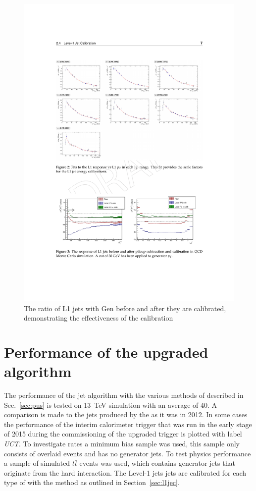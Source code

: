 \begin{figure}
	\begin{center}
		\includegraphics[width=1.0\linewidth]{figs/trigger/pu140_calib_closure}
  \caption{The ratio of L1 jets with Gen before and after they are calibrated,
demonstrating the effectiveness of the calibration}
  \label{fig:pu140calibclosure}
	\end{center}
\end{figure}

\section{Performance of the upgraded algorithm}

\label{sec:jet_algo_performance}

The performance of the jet algorithm with the various methods of \PUS 
described in Sec.~\ref{sec:pus} is tested on 13~TeV \MC simulation with an
average \PU of 40. A comparison is made to the jets produced by the
\GCT as it was in 2012. In some cases the performance of the interim
calorimeter trigger that was run in the early stage of 2015 during the
commissioning of the upgraded trigger is plotted with label
\emph{UCT}. To investigate rates a minimum bias sample was used, this
sample only consists of overlaid \PU events and has no generator jets.
To test physics performance a sample of simulated $t\bar{t}$
events was used, which contains generator jets that originate from
the hard interaction. The Level-1 jets jets are calibrated for each
type of \PUS with the method as outlined in Section~\ref{sec:l1jec}.

